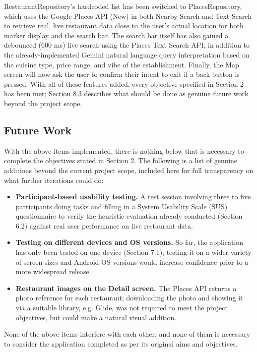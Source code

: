\documentclass[12pt, a4paper]{article}
\begin{document}
RestaurantRepository's hardcoded list has been switched to PlacesRepository, which uses the Google Places API (New) in both Nearby Search and Text Search to retrieve real, live restaurant data close to the user's actual location for both marker display and the search bar. The search bar itself has also gained a debounced (600 ms) live search using the Places Text Search API, in addition to the already-implemented Gemini natural language query interpretation based on the cuisine type, price range, and vibe of the establishment. Finally, the Map screen will now ask the user to confirm their intent to exit if a back button is pressed. With all of these features added, every objective specified in Section 2 has been met; Section 8.3 describes what should be done as genuine future work beyond the project scope.

\subsection{Future Work}

With the above items implemented, there is nothing below that is necessary to complete the objectives stated in Section 2. The following is a list of genuine additions beyond the current project scope, included here for full transparency on what further iterations could do:

\begin{itemize}
    \item \textbf{Participant-based usability testing.} A test session involving three to five participants doing tasks and filling in a System Usability Scale (SUS) questionnaire to verify the heuristic evaluation already conducted (Section 6.2) against real user performance on live restaurant data.
    \item \textbf{Testing on different devices and OS versions.} So far, the application has only been tested on one device (Section 7.1); testing it on a wider variety of screen sizes and Android OS versions would increase confidence prior to a more widespread release.
    \item \textbf{Restaurant images on the Detail screen.} The Places API returns a photo reference for each restaurant; downloading the photo and showing it via a suitable library, e.g. Glide, was not required to meet the project objectives, but could make a natural visual addition.
\end{itemize}

None of the above items interfere with each other, and none of them is necessary to consider the application completed as per its original aims and objectives.
\end{document}
